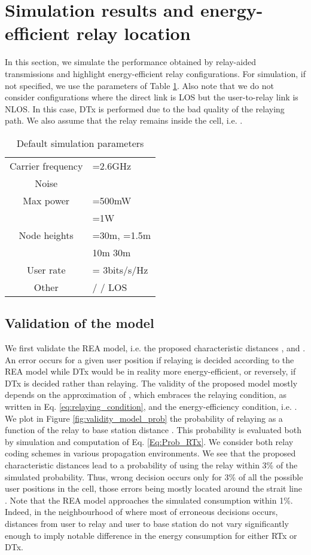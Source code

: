 \documentclass[journal]{IEEEtran}
\theoremstyle{definition}
\begin{document}
\section{Simulation results and energy-efficient relay location}
\label{sec:simulation}

In this section, we simulate the performance obtained by relay-aided transmissions and highlight energy-efficient relay configurations.
For simulation, if not specified, we use the parameters of Table \ref{sim_param}. 
Also note that we do not consider configurations where the direct link  is LOS but the user-to-relay link  is NLOS. In this case, DTx is performed due to the bad quality of the relaying path. We also assume that the relay remains inside the cell, i.e. .

\begin{table}
\centering \small{ \begin{tabular}{|c|l|} 
\hline
Carrier frequency & =2.6GHz   \\
Noise &  \\
Max power & =500mW \\
& =1W  \\
Node heights & =30m, =1.5m \\
 & 10m  30m \\
 User rate & = 3bits/s/Hz \\
 Other &  /  /  LOS \\
\hline
\end{tabular}}
\caption{Default simulation parameters}  \label{sim_param}
\end{table}


\subsection{Validation of the model}

We first validate the REA model, i.e. the proposed characteristic distances ,  and . An error occurs for a given user position if relaying is decided according to the REA model while DTx would be in reality more energy-efficient, or reversely, if DTx is decided rather than relaying. The validity of the proposed model mostly depends on the approximation of , which embraces the relaying condition, as written in Eq. \eqref{eq:relaying_condition}, and the energy-efficiency condition, i.e. .
We plot in Figure \ref{fig:validity_model_prob} the probability of relaying as a function of the relay to base station distance . This probability is evaluated both by simulation and computation of Eq. \eqref{Eq:Prob_RTx}.
We consider both relay coding schemes in various propagation environments. We see that the proposed characteristic distances lead to a probability of using the relay within 3\% of the simulated probability. Thus, wrong decision occurs only for 3\% of all the possible user positions in the cell, those errors being mostly located around the strait line .
Note that the REA model approaches the simulated consumption within 1\%. Indeed, in the neighbourhood of  where most of erroneous decisions occurs, distances from user to relay and user to base station do not vary significantly enough to imply notable difference in the energy consumption for either RTx or DTx. 
\end{document}
